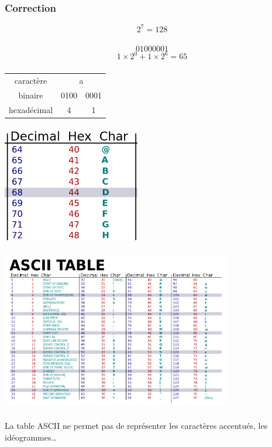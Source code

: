 \documentclass[svgnames,11pt]{beamer}
\begin{document}
\begin{frame}
    \frametitle{Correction}


        {\Large $$2^7=128$$}


\end{frame}
\begin{frame}
    \frametitle{}

    {\Large $$01000001$$}
    {\Large $$1×2^0+1×2^6=65$$}


\end{frame}
\begin{frame}
    \frametitle{}
{\Large
    \begin{center}
        \begin{tabular}{ccc}
            caractère&\multicolumn{2}{c}{a}\\ 
            binaire&0100&0001\\
            hexadécimal&4&1\\
        \end{tabular}
    \end{center}
}
\begin{center}
\centering
\includegraphics[width=6cm]{ressources/ascii.png}
\label{IMG}
\end{center}
\end{frame}
\begin{frame}
    \frametitle{}

    \includegraphics[width=10cm]{ressources/ascii-all.png}

\end{frame}
\begin{frame}
    \frametitle{}

    \begin{aretenir}[Remarque]
    La table ASCII ne permet pas de représenter les caractères accentués, les idéogrammes\dots
    \end{aretenir}

\end{frame}
\end{document}

